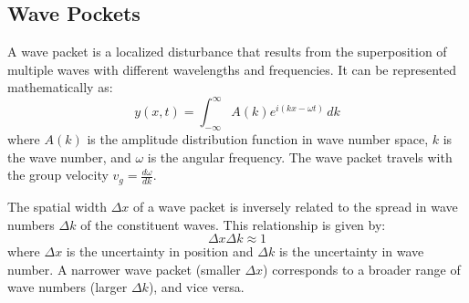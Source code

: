 \documentclass[11pt]{report}
\begin{document}
\subsection{Wave Pockets}
\begin{definition}
    A wave packet is a localized disturbance that results from the superposition of multiple waves with different wavelengths and frequencies. It can be represented mathematically as:
    \begin{equation}
        y(x,t) = \int_{-\infty}^{\infty} A(k) e^{i(kx - \omega t)} \, dk
    \end{equation}
    where \( A(k) \) is the amplitude distribution function in wave number space, \( k \) is the wave number, and \( \omega \) is the angular frequency. The wave packet travels with the group velocity \( v_g = \frac{d\omega}{dk} \).
\end{definition}

\begin{definition}
    The spatial width \( \Delta x \) of a wave packet is inversely related to the spread in wave numbers \( \Delta k \) of the constituent waves. This relationship is given by:
    \begin{equation}
        \Delta x \Delta k \approx 1
    \end{equation}
    where \( \Delta x \) is the uncertainty in position and \( \Delta k \) is the uncertainty in wave number. A narrower wave packet (smaller \( \Delta x \)) corresponds to a broader range of wave numbers (larger \( \Delta k \)), and vice versa.
    
\end{definition}
\end{document}
